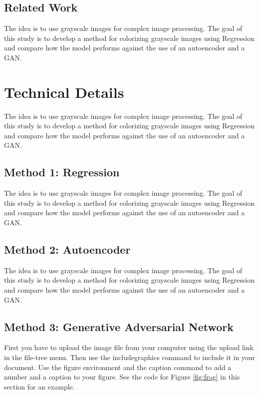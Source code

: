 \documentclass{article}
\begin{document}
\subsection{Related Work}

The idea is to use grayscale images for complex image processing. The goal of this
study is to develop a method for colorizing grayscale images using Regression and
compare how the model performs against the use of an autoencoder and a GAN. 

\section{Technical Details}

The idea is to use grayscale images for complex image processing. The goal of this
study is to develop a method for colorizing grayscale images using Regression and
compare how the model performs against the use of an autoencoder and a GAN. 

\subsection{Method 1: Regression}

The idea is to use grayscale images for complex image processing. The goal of this
study is to develop a method for colorizing grayscale images using Regression and
compare how the model performs against the use of an autoencoder and a GAN. 

\subsection{Method 2: Autoencoder}

The idea is to use grayscale images for complex image processing. The goal of this
study is to develop a method for colorizing grayscale images using Regression and
compare how the model performs against the use of an autoencoder and a GAN. 

\subsection{Method 3: Generative Adversarial Network}

First you have to upload the image file from your computer using the upload link in the file-tree menu. Then use the includegraphics command to include it in your document. Use the figure environment and the caption command to add a number and a caption to your figure. See the code for Figure \ref{fig:frog} in this section for an example.
\end{document}
